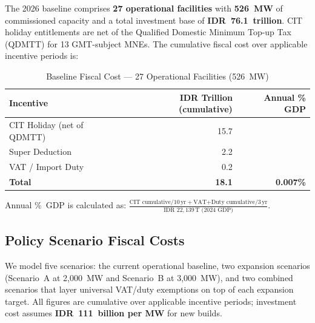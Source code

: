 \documentclass[11pt,a4paper]{article}
\begin{document}
The 2026 baseline comprises \textbf{27 operational facilities} with \textbf{526~MW} of commissioned capacity and a total investment base of \textbf{IDR~76.1~trillion}. CIT holiday entitlements are net of the Qualified Domestic Minimum Top-up Tax (QDMTT) for 13 GMT-subject MNEs. The cumulative fiscal cost over applicable incentive periods is:

\begin{table}[H]
\centering
\caption{Baseline Fiscal Cost --- 27 Operational Facilities (526~MW)}
\begin{tabular}{lrr}
\toprule
\textbf{Incentive} & \textbf{IDR Trillion (cumulative)} & \textbf{Annual \% GDP} \\
\midrule
CIT Holiday (net of QDMTT) & 15.7 & \\
Super Deduction            & 2.2  & \\
VAT / Import Duty          & 0.2  & \\
\midrule
\textbf{Total}             & \textbf{18.1} & \textbf{0.007\%} \\
\bottomrule
\end{tabular}
\end{table}

\noindent Annual \%~GDP is calculated as: $\frac{\text{CIT cumulative} / 10\,\text{yr} + \text{VAT+Duty cumulative} / 3\,\text{yr}}{\text{IDR }22{,}139\,\text{T (2024 GDP)}}$.

\subsection{Policy Scenario Fiscal Costs}

We model five scenarios: the current operational baseline, two expansion scenarios (Scenario~A at 2,000~MW and Scenario~B at 3,000~MW), and two combined scenarios that layer universal VAT/duty exemptions on top of each expansion target. All figures are cumulative over applicable incentive periods; investment cost assumes \textbf{IDR~111~billion per MW} for new builds.
\end{document}
